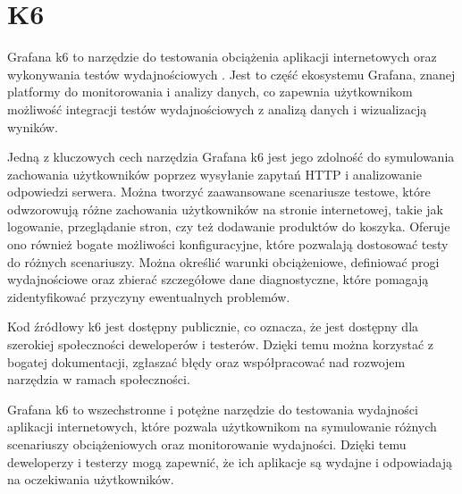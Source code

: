 \section{K6}

Grafana k6 to narzędzie do testowania obciążenia aplikacji internetowych oraz wykonywania testów wydajnościowych \cite{grafanak6}.
Jest to część ekosystemu Grafana, znanej platformy do monitorowania i analizy danych, co zapewnia użytkownikom możliwość integracji testów wydajnościowych z analizą danych i wizualizacją wyników.

Jedną z kluczowych cech narzędzia Grafana k6 jest jego zdolność do symulowania zachowania użytkowników poprzez wysyłanie zapytań HTTP i analizowanie odpowiedzi serwera.
Można tworzyć zaawansowane scenariusze testowe, które odwzorowują różne zachowania użytkowników na stronie internetowej, takie jak logowanie, przeglądanie stron, czy też dodawanie produktów do koszyka.
Oferuje ono również bogate możliwości konfiguracyjne, które pozwalają dostosować testy do różnych scenariuszy.
Można określić warunki obciążeniowe, definiować progi wydajnościowe oraz zbierać szczegółowe dane diagnostyczne, które pomagają zidentyfikować przyczyny ewentualnych problemów.

Kod źródłowy k6 jest dostępny publicznie, co oznacza, że jest dostępny dla szerokiej społeczności deweloperów i testerów.
Dzięki temu można korzystać z bogatej dokumentacji, zgłaszać błędy oraz współpracować nad rozwojem narzędzia w ramach społeczności.

Grafana k6 to wszechstronne i potężne narzędzie do testowania wydajności aplikacji internetowych, które pozwala użytkownikom na symulowanie różnych scenariuszy obciążeniowych oraz monitorowanie wydajności.
Dzięki temu deweloperzy i testerzy mogą zapewnić, że ich aplikacje są wydajne i odpowiadają na oczekiwania użytkowników.